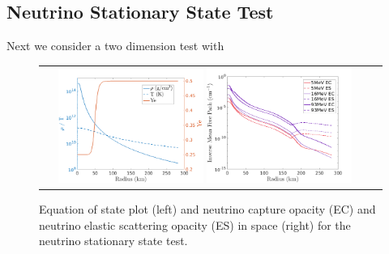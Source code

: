 \subsection{Neutrino Stationary State Test}
Next we consider a two dimension test with

\label{se: Neutrino Stationary State Test}
\begin{figure}[h]
  \centering
  \begin{tabular}{cc}
    \includegraphics[width=0.45\textwidth]{figures/NStatinaryS_EOS}
    \includegraphics[width=0.45\textwidth]{figures/NSS_Opacities}
  \end{tabular}
   \caption{Equation of state plot (left) and neutrino capture opacity (EC) and neutrino elastic scattering opacity (ES) in space (right) for the neutrino stationary state test.}
   \label{fig:NeutrinoStationaryTestEOS}
\end{figure}

